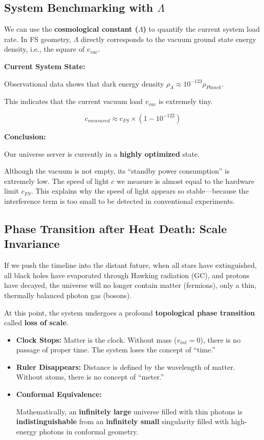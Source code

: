 \subsection{System Benchmarking with $\Lambda$}

We can use the \textbf{cosmological constant ($\Lambda$)} to quantify the current system load rate. In FS geometry, $\Lambda$ directly corresponds to the vacuum ground state energy density, i.e., the square of \textbf{$v_{vac}$}.

\textbf{Current System State:}

Observational data shows that dark energy density $\rho_{\Lambda} \approx 10^{-123} \rho_{Planck}$.

This indicates that the current vacuum load \textbf{$v_{vac}$} is extremely tiny.

$$c_{measured} \approx c_{FS} \times (1 - 10^{-122})$$

\textbf{Conclusion:}

Our universe server is currently in a \textbf{highly optimized} state.

Although the vacuum is not empty, its ``standby power consumption'' is extremely low. The speed of light \textbf{$c$} we measure is almost equal to the hardware limit \textbf{$c_{FS}$}. This explains why the speed of light appears so stable---because the interference term is too small to be detected in conventional experiments.

\subsection{Phase Transition after Heat Death: Scale Invariance}

If we push the timeline into the distant future, when all stars have extinguished, all black holes have evaporated through Hawking radiation (GC), and protons have decayed, the universe will no longer contain matter (fermions), only a thin, thermally balanced photon gas (bosons).

At this point, the system undergoes a profound \textbf{topological phase transition} called \textbf{loss of scale}.

\begin{itemize}
\item \textbf{Clock Stops:} Matter is the clock. Without mass (\textbf{$v_{int} = 0$}), there is no passage of proper time. The system loses the concept of ``time.''

\item \textbf{Ruler Disappears:} Distance is defined by the wavelength of matter. Without atoms, there is no concept of ``meter.''

\item \textbf{Conformal Equivalence:}

    Mathematically, an \textbf{infinitely large} universe filled with thin photons is \textbf{indistinguishable} from an \textbf{infinitely small} singularity filled with high-energy photons in conformal geometry.
\end{itemize}

